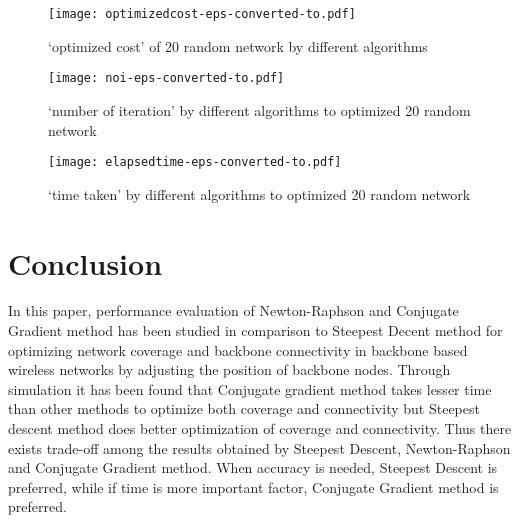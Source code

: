 \documentclass[11pt]{article}
\numberwithin{equation}{section}
\begin{document}
\begin{figure*}[htb!]
\begin{center}
\texttt{[image: optimizedcost-eps-converted-to.pdf]}
\end{center}
\caption{`optimized cost' of 20 random network by different algorithms}\label{f13}
\end{figure*}
\begin{figure*}[htb!]
\begin{center}
\texttt{[image: noi-eps-converted-to.pdf]}
\end{center}
\caption{`number of iteration' by different algorithms to optimized 20 random network }\label{f14}
\end{figure*}
\begin{figure*}[htb!]
\begin{center}
\texttt{[image: elapsedtime-eps-converted-to.pdf]}
\end{center}
\caption{`time taken' by different algorithms to optimized 20 random network}\label{f15}
\end{figure*}


\newpage
\section{Conclusion}
In this paper, performance evaluation of Newton-Raphson and Conjugate Gradient method has been studied in comparison to Steepest Decent method for optimizing network coverage and backbone connectivity in backbone based wireless networks by adjusting the position of backbone nodes. Through simulation it has been found that Conjugate gradient method takes lesser time than other methods to optimize both coverage and connectivity but Steepest descent method does better optimization of coverage and connectivity. Thus there exists trade-off among the results obtained by Steepest Descent, Newton-Raphson and Conjugate Gradient method. When accuracy is needed, Steepest Descent is preferred, while if time is more important factor, Conjugate Gradient method is preferred.\\
\end{document}

